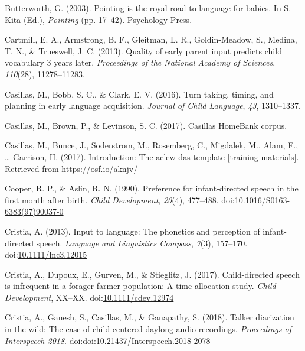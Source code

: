 \documentclass[floatsintext,man]{apa6}
\theoremstyle{definition}
\theoremstyle{definition}
\theoremstyle{definition}
\theoremstyle{remark}
\begin{document}
\hypertarget{ref-butterworth2003pointing}{}
Butterworth, G. (2003). Pointing is the royal road to language for
babies. In S. Kita (Ed.), \emph{Pointing} (pp. 17--42). Psychology
Press.

\hypertarget{ref-cartmill2013quality}{}
Cartmill, E. A., Armstrong, B. F., Gleitman, L. R., Goldin-Meadow, S.,
Medina, T. N., \& Trueswell, J. C. (2013). Quality of early parent input
predicts child vocabulary 3 years later. \emph{Proceedings of the
National Academy of Sciences}, \emph{110}(28), 11278--11283.

\hypertarget{ref-casillas2016turn}{}
Casillas, M., Bobb, S. C., \& Clark, E. V. (2016). Turn taking, timing,
and planning in early language acquisition. \emph{Journal of Child
Language}, \emph{43}, 1310--1337.

\hypertarget{ref-Casillas-HB}{}
Casillas, M., Brown, P., \& Levinson, S. C. (2017). Casillas HomeBank
corpus.

\hypertarget{ref-casillas2017ACLEWDAS}{}
Casillas, M., Bunce, J., Soderstrom, M., Rosemberg, C., Migdalek, M.,
Alam, F., \ldots{} Garrison, H. (2017). Introduction: The aclew das
template {[}training materials{]}. Retrieved from
\url{https://osf.io/aknjv/}

\hypertarget{ref-cooper1990preference}{}
Cooper, R. P., \& Aslin, R. N. (1990). Preference for infant-directed
speech in the first month after birth. \emph{Child Development},
\emph{20}(4), 477--488.
doi:\href{https://doi.org/10.1016/S0163-6383(97)90037-0}{10.1016/S0163-6383(97)90037-0}

\hypertarget{ref-cristia2013input}{}
Cristia, A. (2013). Input to language: The phonetics and perception of
infant-directed speech. \emph{Language and Linguistics Compass},
\emph{7}(3), 157--170.
doi:\href{https://doi.org/10.1111/lnc3.12015}{10.1111/lnc3.12015}

\hypertarget{ref-cristia2017child}{}
Cristia, A., Dupoux, E., Gurven, M., \& Stieglitz, J. (2017).
Child-directed speech is infrequent in a forager-farmer population: A
time allocation study. \emph{Child Development}, XX--XX.
doi:\href{https://doi.org/10.1111/cdev.12974}{10.1111/cdev.12974}

\hypertarget{ref-cristia2018talker}{}
Cristia, A., Ganesh, S., Casillas, M., \& Ganapathy, S. (2018). Talker
diarization in the wild: The case of child-centered daylong
audio-recordings. \emph{Proceedings of Interspeech 2018}.
doi:\href{https://doi.org/doi:10.21437/Interspeech.2018-2078}{doi:10.21437/Interspeech.2018-2078}
\end{document}

